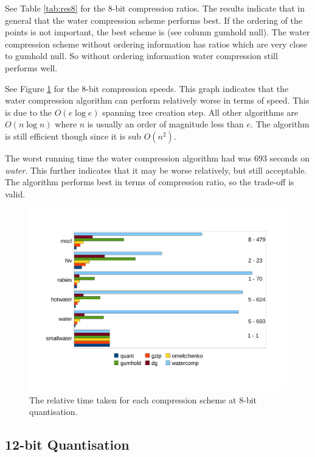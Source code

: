 \documentclass[a4paper]{report}
\begin{document}
See Table \ref{tab:res8} for the $8$-bit compression ratios. The results
indicate that in general that the water compression scheme performs best. If
the ordering of the points is not important, the best scheme is
\citep{gumholdcomp} (see column gumhold null). The water compression scheme
without ordering information has ratios which are very close to gumhold
null. So without ordering information water compression still performs well.

See Figure \ref{fig:speed8} for the $8$-bit compression speeds. This graph
indicates that the water compression algorithm can perform relatively worse in
terms of speed. This is due to the $O(e \log e)$ spanning tree creation
step. All other algorithms are $O(n \log n)$ where $n$ is usually an order of
magnitude less than $e$. The algorithm is still efficient though since it is
sub $O(n^2)$.

The worst running time the water compression algorithm had was $693$ seconds
on \emph{water}. This further indicates that it may be worse relatively, but
still acceptable. The algorithm performs best in terms of compression ratio,
so the trade-off is valid.

\begin{figure}[h]
\centering
\includegraphics{images/speed8}
\caption{The relative time taken for each compression scheme at $8$-bit quantisation.}
\label{fig:speed8}
\end{figure}


\subsection{12-bit Quantisation}
\end{document}
